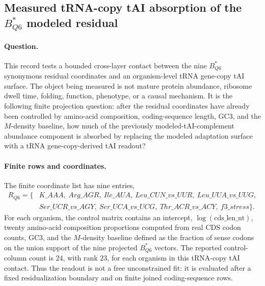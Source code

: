 \subsection{Measured tRNA-copy tAI absorption of the $B^*_{Q6}$ modeled residual}
\label{sec:bioreality-q6-measured-trna-tai-absorption}

\paragraph{Question.}
This record tests a bounded cross-layer contact between the nine $B^*_{Q6}$ synonymous residual coordinates and an organism-level tRNA gene-copy tAI surface.  The object being measured is not mature protein abundance, ribosome dwell time, folding, function, phenotype, or a causal mechanism.  It is the following finite projection question: after the residual coordinates have already been controlled by amino-acid composition, coding-sequence length, GC3, and the $M$-density baseline, how much of the previously modeled-tAI-complement abundance component is absorbed by replacing the modeled adaptation surface with a tRNA gene-copy-derived tAI readout?

\paragraph{Finite rows and coordinates.}
The finite coordinate list has nine entries,
$$
\begin{aligned}
R_{Q6}=\{&K\_AAA,\ Arg\_AGR,\ Ile\_AUA,\ Leu\_CUN\_vs\_UUR,\ Leu\_UUA\_vs\_UUG,\\
&Ser\_UCR\_vs\_AGY,\ Ser\_UCA\_vs\_UCG,\ Thr\_ACR\_vs\_ACY,\ f3\_stress\}.
\end{aligned}
$$
For each organism, the control matrix contains an intercept, $\log(\mathrm{cds\_len\_nt})$, twenty amino-acid composition proportions computed from real CDS codon counts, GC3, and the $M$-density baseline defined as the fraction of sense codons on the union support of the nine projected $B^*_{Q6}$ vectors.  The reported control-column count is $24$, with rank $23$, for each organism in this tRNA-copy tAI contact.  Thus the readout is not a free unconstrained fit: it is evaluated after a fixed residualization boundary and on finite joined coding-sequence rows.


